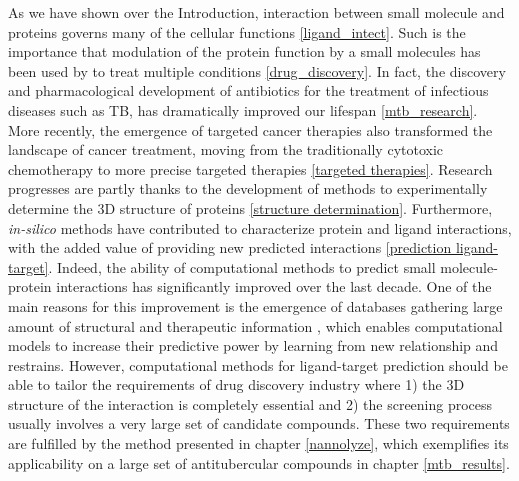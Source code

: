 \documentclass[12pt, b5paper,twoside]{tesi_upf}
\begin{document}
\par As we have shown over the Introduction, interaction between small molecule and proteins governs many of the cellular functions \ref{ligand_intect}. Such is the importance that modulation of the protein function by a small molecules has been used by to treat multiple conditions \ref{drug_discovery}. In fact, the discovery and pharmacological development of antibiotics for the treatment of infectious diseases such as TB, has dramatically improved our lifespan \ref{mtb_research}. More recently, the emergence of targeted cancer therapies also transformed the landscape of cancer treatment, moving from the traditionally cytotoxic chemotherapy to more precise targeted therapies \ref{targeted therapies}. Research progresses are partly thanks to the development of methods to experimentally determine the 3D structure of proteins \ref{structure determination}. Furthermore, \textit{in-silico} methods have contributed to characterize protein and ligand interactions, with the added value of providing new predicted interactions \ref{prediction ligand-target}. Indeed, the ability of computational methods to predict small molecule-protein interactions has significantly improved over the last decade. One of the main reasons for this improvement is the emergence of databases gathering large amount of structural and therapeutic information \cite{Liu2007, Bento2014, Zhu2012}, which enables computational models to increase their predictive power by learning from new relationship and restrains. However, computational methods for ligand-target prediction should be able to tailor the requirements of drug discovery industry where 1) the 3D structure of the interaction is completely essential and 2) the screening process usually involves a very large set of candidate compounds. These two requirements are fulfilled by the method presented in chapter \ref{nannolyze}, which exemplifies its applicability on a large set of antitubercular compounds in chapter \ref{mtb_results}. 
\end{document}
